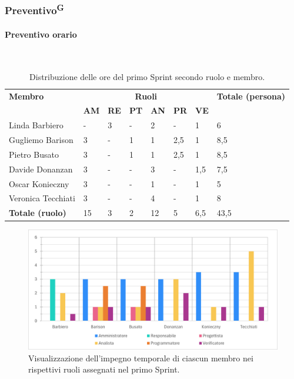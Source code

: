 \documentclass[8pt]{article}
\newcommand{\glossterm}[1]{#1\textsuperscript{G}} %
\newcommand{\subsubsubsection}[1]{\paragraph{#1}\mbox{}\\}
\begin{document}
\subsubsection{\glossterm{Preventivo}}
\subsubsubsection{Preventivo orario}
\begin{table}[ht!]
	\centering
	\begin{tabular}{p{4cm} p{1cm} p{1cm} p{1cm} p{1cm} p{1cm} p{1cm} p{3cm}}
		\toprule
        \textbf{Membro} & \multicolumn{6}{c}{\textbf{Ruoli}} & \textbf{Totale (persona)}\\
		& \textbf{AM} & \textbf{RE} & \textbf{PT} & \textbf{AN} & \textbf{PR} & \textbf{VE}\\
		\midrule
        Linda Barbiero & - & 3 & - & 2 & - & 1 & 6 \\
        Gugliemo Barison & 3 & - & 1 & 1 & 2,5 & 1 & 8,5 \\
        Pietro Busato & 3 & - & 1 & 1 & 2,5 & 1 & 8,5 \\
        Davide Donanzan & 3 & - & - & 3 & - & 1,5 & 7,5 \\
        Oscar Konieczny & 3 & - & - & 1 & - & 1 & 5 \\
        Veronica Tecchiati & 3 & - & - & 4 & - & 1 & 8 \\
        \bottomrule
        \textbf{Totale (ruolo)} & 15 & 3 & 2 & 12 & 5 & 6,5 & 43,5 \\
	\end{tabular}
	\caption{Distribuzione delle ore del primo Sprint secondo ruolo e membro.}
	\label{table:Distribuzione delle ore del primo Sprint secondo ruolo e membro}
\end{table}
\begin{figure}[ht!]
    \centering
    \includegraphics[width=15cm]{./images_pdp/istogramma_periodo_1.png}
    \caption{Visualizzazione dell'impegno temporale di ciascun membro nei rispettivi ruoli assegnati
    nel primo Sprint.}
    \label{figure:Visualizzazione dell'impegno temporale di ciascun membro nei rispettivi ruoli
    assegnati nel primo Sprint}
\end{figure}
\end{document}
